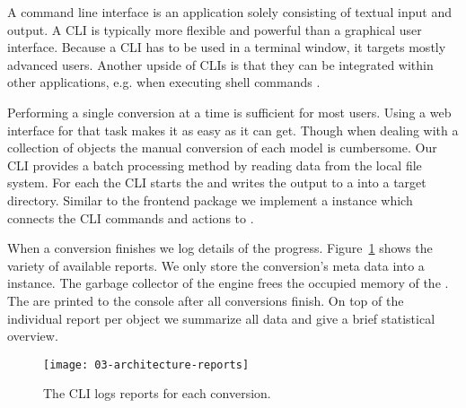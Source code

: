 \documentclass[../../ClassicThesis.tex]{subfiles}
\begin{document}
A command line interface is an application solely consisting of
textual input and output. A CLI is typically more flexible and
powerful than a graphical user interface. Because a CLI has to be used
in a terminal window, it targets mostly advanced users. Another upside
of CLIs is that they can be integrated within other applications,
e.g. when executing shell commands \cite{cli}.

Performing a single conversion at a time is sufficient for most
users. Using a web interface for that task makes it as easy as it can
get. Though when dealing with a collection of objects the manual
conversion of each model is cumbersome. Our CLI provides a batch
processing method by reading data from the local file system. For each
{\stlfile} the CLI starts the  and writes the
output to a {\zipfile} into a target directory. Similar to the
frontend package we implement a  instance which
connects the CLI commands and actions to {\convertify}.

When a conversion finishes we log details of the progress.
Figure~\ref{fig:reports} shows the variety of available
reports. We only store the conversion's meta data into a
 instance. The garbage collector of the
{\javascript} engine frees the occupied memory of the
{\threedmodel}. The  are printed to the
console after all conversions finish. On top of the
individual report per object we summarize all data and give
a brief statistical overview.

\begin{figure}[!p]
  \centering
  \texttt{[image: 03-architecture-reports]}
  \caption{The CLI logs reports for each conversion.}
  \label{fig:reports}
\end{figure}




\end{document}
